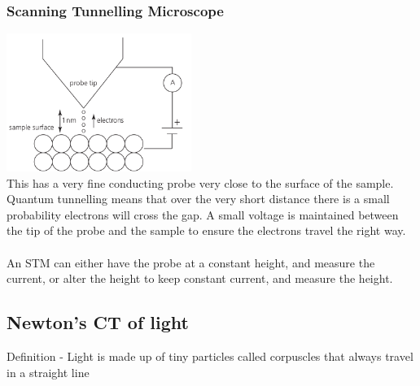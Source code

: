 \documentclass[12pt]{article}
\begin{document}
\subsubsection{Scanning Tunnelling Microscope}
\includegraphics[width=6cm]{stm.png}\\
This has a very fine conducting probe very close to the surface of the sample. Quantum tunnelling means that over the very short distance there is a small probability electrons will cross the gap. A small voltage is maintained between the tip of the probe and the sample to ensure the electrons travel the right way.\\
\\
An STM can either have the probe at a constant height, and measure the current, or alter the height to keep constant current, and measure the height.
\subsection{Newton's CT of light}
Definition - Light is made up of tiny particles called corpuscles that always travel in a straight line
\end{document}

